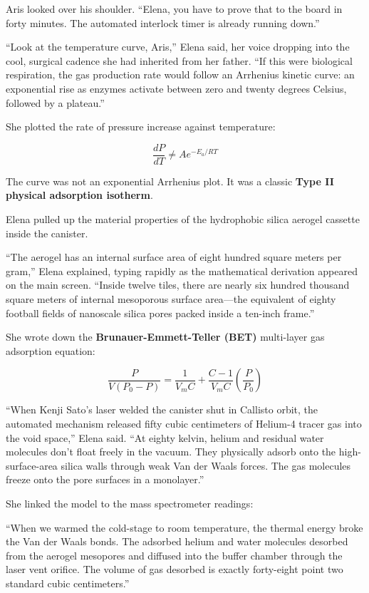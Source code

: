 \documentclass[12pt,twoside,openright]{book}
\begin{document}
Aris looked over his shoulder. ``Elena, you have to prove that to the
board in forty minutes. The automated interlock timer is already running
down.''

``Look at the temperature curve, Aris,'' Elena said, her voice dropping
into the cool, surgical cadence she had inherited from her father. ``If
this were biological respiration, the gas production rate would follow
an Arrhenius kinetic curve: an exponential rise as enzymes activate
between zero and twenty degrees Celsius, followed by a plateau.''

She plotted the rate of pressure increase against temperature:

\[\frac{dP}{dT} \neq A e^{-E_a / R T}\]

The curve was not an exponential Arrhenius plot. It was a classic
\textbf{Type II physical adsorption isotherm}.

Elena pulled up the material properties of the hydrophobic silica
aerogel cassette inside the canister.

``The aerogel has an internal surface area of eight hundred square
meters per gram,'' Elena explained, typing rapidly as the mathematical
derivation appeared on the main screen. ``Inside twelve tiles, there are
nearly six hundred thousand square meters of internal mesoporous surface
area---the equivalent of eighty football fields of nanoscale silica
pores packed inside a ten-inch frame.''

She wrote down the \textbf{Brunauer-Emmett-Teller (BET)} multi-layer gas
adsorption equation:

\[\frac{P}{V (P_0 - P)} = \frac{1}{V_m C} + \frac{C - 1}{V_m C} \left( \frac{P}{P_0} \right)\]

``When Kenji Sato's laser welded the canister shut in Callisto orbit,
the automated mechanism released fifty cubic centimeters of Helium-4
tracer gas into the void space,'' Elena said. ``At eighty kelvin, helium
and residual water molecules don't float freely in the vacuum. They
physically adsorb onto the high-surface-area silica walls through weak
Van der Waals forces. The gas molecules freeze onto the pore surfaces in
a monolayer.''

She linked the model to the mass spectrometer readings:

``When we warmed the cold-stage to room temperature, the thermal energy
broke the Van der Waals bonds. The adsorbed helium and water molecules
desorbed from the aerogel mesopores and diffused into the buffer chamber
through the laser vent orifice. The volume of gas desorbed is exactly
forty-eight point two standard cubic centimeters.''
\end{document}
